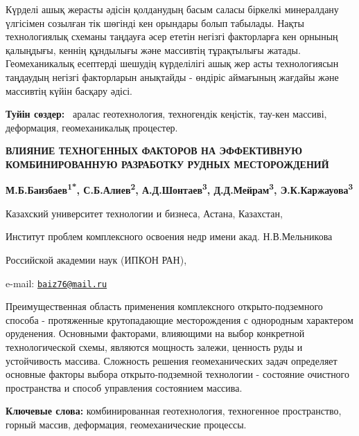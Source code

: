 Күрделі ашық жерасты әдісін қолданудың басым саласы біркелкі минералдану
үлгісімен созылған тік шөгінді кен орындары болып табылады. Нақты
технологиялық схеманы таңдауға әсер ететін негізгі факторларға кен
орнының қалыңдығы, кеннің құндылығы және массивтің тұрақтылығы жатады.
Геомеханикалық есептерді шешудің күрделілігі ашық жер асты технологиясын
таңдаудың негізгі факторларын анықтайды - өндіріс аймағының жағдайы және
массивтің күйін басқару әдісі.

{\bfseries Туйін сөздер:} \emph{~}аралас геотехнология, техногендік
кеңістік, тау-кен массиві, деформация, геомеханикалық процестер.

\begin{center}
{\large\bfseries ВЛИЯНИЕ ТЕХНОГЕННЫХ ФАКТОРОВ НА ЭФФЕКТИВНУЮ КОМБИНИРОВАННУЮ РАЗРАБОТКУ РУДНЫХ МЕСТОРОЖДЕНИЙ}

{\bfseries М.Б.Баизбаев\textsuperscript{1*}, С.Б.Алиев\textsuperscript{2},
А.Д.Шонтаев\textsuperscript{3}, Д.Д.Мейрам\textsuperscript{3},
Э.К.Каржауова\textsuperscript{3}}

Казахский университет технологии и бизнеса, Астана, Казахстан,

Институт проблем комплексного освоения недр имени акад. Н.В.Мельникова

Российской академии наук (ИПКОН РАН),

e-mail: \href{mailto:baiz76@mail.ru}{\nolinkurl{baiz76@mail.ru}}
\end{center}

Преимущественная область применения комплексного открыто-подземного
способа - протяженные крутопадающие месторождения с однородным
характером оруденения. Основными факторами, влияющими на выбор
конкретной технологической схемы, являются мощность залежи, ценность
руды и устойчивость массива. Сложность решения геомеханических задач
определяет основные факторы выбора открыто-подземной технологии -
состояние очистного пространства и способ управления состоянием массива.

{\bfseries Ключевые слова:} комбинированная геотехнология, техногенное
пространство, горный массив, деформация, геомеханические процессы.

